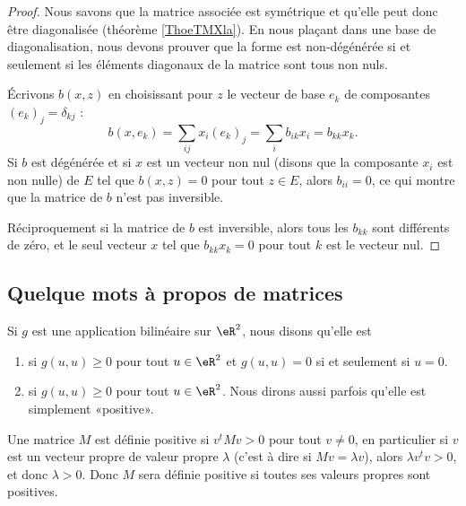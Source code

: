 \begin{proof}
    Nous savons que la matrice associée est symétrique et qu'elle peut donc être diagonalisée (théorème \ref{ThoeTMXla}). En nous plaçant dans une base de diagonalisation, nous devons prouver que la forme est non-dégénérée si et seulement si les éléments diagonaux de la matrice sont tous non nuls.

    Écrivons \( b(x,z)\) en choisissant pour \( z\) le vecteur de base \( e_k\) de composantes \( (e_k)_j=\delta_{kj}\) :
    \begin{equation}
            b(x,e_k)=\sum_{ij}x_i(e_k)_j
            =\sum_i b_{ik}x_i
            =b_{kk}x_k.
    \end{equation}
    Si \( b\) est dégénérée et si \( x\) est un vecteur non nul (disons que la composante \( x_i\) est non nulle) de \( E\) tel que \( b(x,z)=0\) pour tout \( z\in E\), alors \( b_{ii}=0\), ce qui montre que la matrice de \( b\) n'est pas inversible.

    Réciproquement si la matrice de \( b\) est inversible, alors tous les \( b_{kk}\) sont différents de zéro, et le seul vecteur \( x\) tel que \( b_{kk}x_k=0\) pour tout \( k\) est le vecteur nul.
\end{proof}

                    \subsection{Quelque mots à propos de matrices}

Si $g$ est une application bilinéaire sur $\eR^2$, nous disons qu'elle est
\begin{enumerate}

\item
{} si $g(u,u)\geq 0$ pour tout $u\in\eR^2$ et $g(u,u)=0$ si et seulement si $u=0$.

\item
{} si $g(u,u)\geq 0$ pour tout $u\in\eR^2$. Nous dirons aussi parfois qu'elle est simplement «positive».

\end{enumerate}

Une matrice $M$ est définie positive si $v^tMv>0$ pour tout $v\neq 0$, en particulier si $v$ est un vecteur propre de valeur propre $\lambda$ (c'est à dire si $Mv=\lambda v$), alors $\lambda v^tv>0$, et donc $\lambda>0$. Donc $M$ sera définie positive si toutes ses valeurs propres sont positives.

